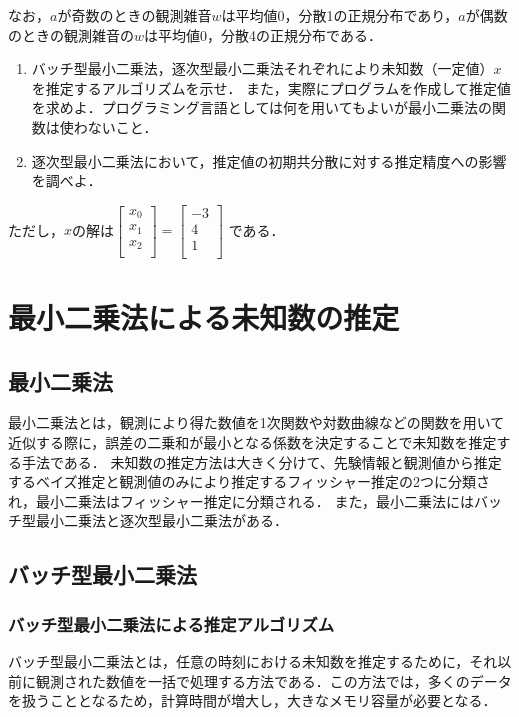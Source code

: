 \documentclass[a4paper]{jarticle}
\begin{document}
なお，$a$が奇数のときの観測雑音$w$は平均値0，分散1の正規分布であり，$a$が偶数のときの観測雑音の$w$は平均値0，分散4の正規分布である．　

\begin{enumerate}[(1)]
\item バッチ型最小二乗法，逐次型最小二乗法それぞれにより未知数（一定値）$x$を推定するアルゴリズムを示せ．
また，実際にプログラムを作成して推定値を求めよ．プログラミング言語としては何を用いてもよいが最小二乗法の関数は使わないこと．

\item 逐次型最小二乗法において，推定値の初期共分散に対する推定精度への影響を調べよ．
\end{enumerate}

ただし，$x$の解は\(
\begin{bmatrix}
{x_0} \\ {x_1} \\{x_2} \\ 
\end{bmatrix} =
\begin{bmatrix}
{-3} \\ {4} \\{1} \\ 
\end{bmatrix}
\)
である．

\newpage
\section{最小二乗法による未知数の推定}
\subsection{最小二乗法}
最小二乗法とは，観測により得た数値を1次関数や対数曲線などの関数を用いて近似する際に，誤差の二乗和が最小となる係数を決定することで未知数を推定する手法である．
未知数の推定方法は大きく分けて、先験情報と観測値から推定するベイズ推定と観測値のみにより推定するフィッシャー推定の2つに分類され，最小二乗法はフィッシャー推定に分類される．
また，最小二乗法にはバッチ型最小二乗法と逐次型最小二乗法がある．


\subsection{バッチ型最小二乗法}
\subsubsection{バッチ型最小二乗法による推定アルゴリズム}
バッチ型最小二乗法とは，任意の時刻における未知数を推定するために，それ以前に観測された数値を一括で処理する方法である．この方法では，多くのデータを扱うこととなるため，計算時間が増大し，大きなメモリ容量が必要となる．
\end{document}
